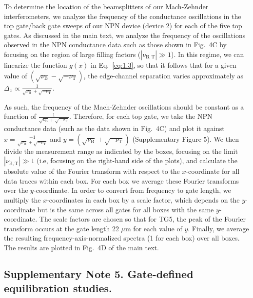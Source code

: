 \documentclass[%
reprint,amsmath,amssymb,aps,prl,superscriptaddress,
twocolumn
]{revtex4-1}
\begin{document}
		To determine the location of the beamsplitters of our Mach-Zehnder interferometers, we analyze the frequency of the conductance oscillations in the top gate/back gate sweeps of our NPN device (device 2) for each of the five top gates. As discussed in the main text, we analyze the frequency of the oscillations observed in the NPN conductance data such as those shown in Fig.~4C by focusing on the region of large filling factors ($|\nu_{\mathrm{B,T}}| \gg 1 $). In this regime, we can linearize the function $g(x)$ in Eq.~\ref{eq:1.3}, so that it follows that for a given value of $(\sqrt{\nu_\mathrm{B}}-\sqrt{-\nu_\mathrm{T}})$, the edge-channel separation varies approximately as $\Delta_x \propto \frac{1}{\sqrt{\nu_\mathrm{B}}+\sqrt{-\nu_\mathrm{T}}}$.
		
		As such, the frequency of the Mach-Zehnder oscillations should be constant as a function of $\frac{1}{\sqrt{\nu_\mathrm{B}}+\sqrt{-\nu_\mathrm{T}}}$. Therefore, for each top gate, we take the NPN conductance data (such as the data shown in Fig.~4C) and plot it against $x = \frac{-1}{\sqrt{\nu_\mathrm{B}}+\sqrt{-\nu_\mathrm{T}}}$ and  $y = (\sqrt{\nu_\mathrm{B}}+\sqrt{-\nu_\mathrm{T}})$ (Supplementary Figure 5). We then divide the measurement range as indicated by the boxes, focusing on the limit $|\nu_{\mathrm{B,T}}| \gg 1$ (i.e, focusing on the right-hand side of the plots), and calculate the absolute value of the Fourier transform with respect to the $x$-coordinate for all data traces within each box. For each box we average these Fourier transforms over the $y$-coordinate.  In order to convert from frequency to gate length, we multiply the $x$-coordinates in each box by a scale factor, which depends on the $y$-coordinate but is the same across all gates for all boxes with the same $y$-coordinate.  The scale factors are chosen so that for TG5, the peak of the Fourier transform occurs at the gate length 22 $\mu$m for each value of $y$. Finally, we average the resulting frequency-axis-normalized spectra (1 for each box) over all boxes. The results are plotted in Fig.~4D of the main text.
		
		
		\subsection{Supplementary Note 5. Gate-defined equilibration studies.}
		
\end{document}
